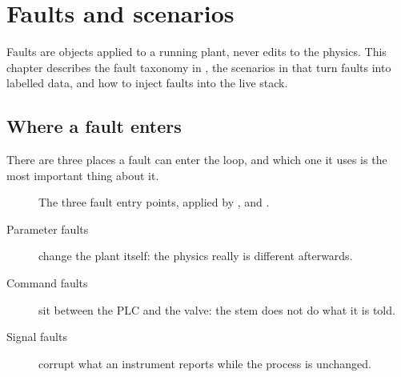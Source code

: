 \chapter{Faults and scenarios}
\label{ch:faults}

Faults are objects applied to a running plant, never edits to the physics.
This chapter describes the fault taxonomy in ,
the scenarios in  that turn faults into
labelled data, and how to inject faults into the live stack.

\section{Where a fault enters}

There are three places a fault can enter the loop, and which one it uses is
the most important thing about it.

\begin{figure}[htbp]
\centering
{}
\caption{The three fault entry points, applied by ,
 and .}
\label{fig:faultentry}
\end{figure}

\begin{description}
  \item[Parameter faults] change the plant itself: the physics really is
        different afterwards.
  \item[Command faults] sit between the PLC and the valve: the stem does not
        do what it is told.
  \item[Signal faults] corrupt what an instrument reports while the process
        is unchanged.
\end{description}

